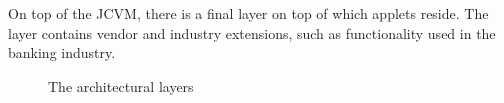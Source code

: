 On top of the JCVM, there is a final layer on top of which applets reside. The layer contains vendor and industry extensions, such as functionality used in the banking industry.

\begin{figure}[H]
\centering

\caption{The \jc architectural layers}
\label{fig:architecture}
\end{figure}